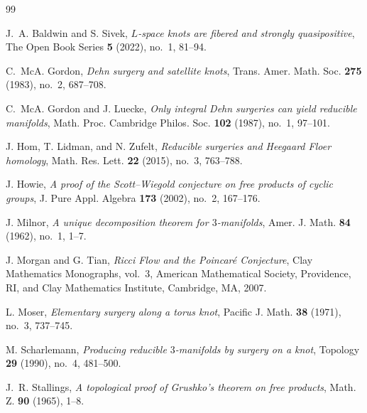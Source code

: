 \documentclass[11pt]{article}
\begin{document}
\begin{thebibliography}{99}

J.~A. Baldwin and S. Sivek,
\emph{\(L\)-space knots are fibered and strongly quasipositive},
The Open Book Series \textbf{5} (2022), no.~1, 81--94.

C.~McA. Gordon,
\emph{Dehn surgery and satellite knots},
Trans. Amer. Math. Soc. \textbf{275} (1983), no.~2, 687--708.

C.~McA. Gordon and J. Luecke,
\emph{Only integral Dehn surgeries can yield reducible manifolds},
Math. Proc. Cambridge Philos. Soc. \textbf{102} (1987), no.~1, 97--101.

J. Hom, T. Lidman, and N. Zufelt,
\emph{Reducible surgeries and Heegaard Floer homology},
Math. Res. Lett. \textbf{22} (2015), no.~3, 763--788.

J. Howie,
\emph{A proof of the Scott--Wiegold conjecture on free products of
cyclic groups},
J. Pure Appl. Algebra \textbf{173} (2002), no.~2, 167--176.

J. Milnor,
\emph{A unique decomposition theorem for \(3\)-manifolds},
Amer. J. Math. \textbf{84} (1962), no.~1, 1--7.

J. Morgan and G. Tian,
\emph{Ricci Flow and the Poincar\'e Conjecture},
Clay Mathematics Monographs, vol.~3,
American Mathematical Society, Providence, RI, and
Clay Mathematics Institute, Cambridge, MA, 2007.

L. Moser,
\emph{Elementary surgery along a torus knot},
Pacific J. Math. \textbf{38} (1971), no.~3, 737--745.

M. Scharlemann,
\emph{Producing reducible \(3\)-manifolds by surgery on a knot},
Topology \textbf{29} (1990), no.~4, 481--500.

J.~R. Stallings,
\emph{A topological proof of Grushko's theorem on free products},
Math. Z. \textbf{90} (1965), 1--8.

\end{thebibliography}
\end{document}
